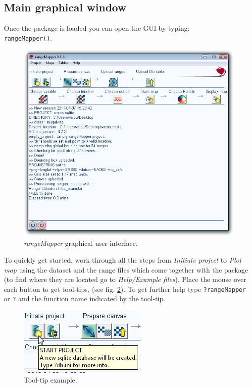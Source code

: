 \documentclass[ a4paper ]{article}
\begin{document}
\subsection{Main graphical window}
Once the package is loaded you can open the GUI by typing:\\
\texttt{rangeMapper()}.
\begin{figure}[htbp]
  \begin{center}
	\includegraphics[width=1\linewidth]{fig1}
    \caption{\label{fig:fig1} \emph{rangeMapper} graphical user interface.}
  \end{center}
\end{figure}
To quickly get started, work through all the steps from \textit{Initiate project} to  \textit{Plot map} using the dataset and the range files which come together with the package (to find where they are located go to  \textit{ Help/Example files}). Place the mouse over each button to get tool-tips, (see fig. \ref{fig:fig2}). To get further help type  \texttt{?rangeMapper}  or \texttt{?} and the function name indicated by the tool-tip. 
	\begin{figure}[htbp]
	  \begin{center}
		\includegraphics[width=0.5\linewidth]{fig2}
		\caption{\label{fig:fig2} Tool-tip example.}
	  \end{center}
	\end{figure}
 \pagebreak	
\end{document}
